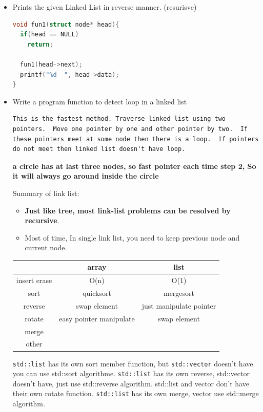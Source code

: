 \documentclass[a4paper,11pt,twoside]{book}
\begin{document}
\begin{itemize}
\begin{lstlisting}[frame=single, language=c++]
\end{lstlisting}


	\item Prints the given Linked List in reverse manner. (resurisve)
\begin{lstlisting}[frame=single, language=c++]
void fun1(struct node* head){
  if(head == NULL)
    return;
  
  fun1(head->next);
  printf("%d  ", head->data);
}
\end{lstlisting}

	\item Write a program function to detect loop in a linked list
\begin{lstlisting}[breaklines]
This is the fastest method. Traverse linked list using two pointers.  Move one pointer by one and other pointer by two.  If these pointers meet at some node then there is a loop.  If pointers do not meet then linked list doesn't have loop.
\end{lstlisting}
\textbf{a circle has at last three nodes, so fast pointer each time step 2, So it will always go around inside the circle}

	\par Summary of link list:
\begin{itemize}
\item \textbf{Just like tree, most link-list problems can be resolved by recursive}.

\item Most of time, In single link list, you need to keep previous node and current node. 
\end{itemize}

\begin{tabular}{|c|c|c|}
\hline 
 & array & list \\ 
\hline 
insert erase & O(n) & O(1) \\ 
\hline 
sort & quicksort & mergesort  \\ 
\hline 
reverse & swap element & just manipulate pointer  \\ 
\hline 
rotate & easy pointer manipulate & swap element  \\ 
\hline 
merge &  &  \\ 
\hline 
other  &  &  \\ 
\hline 
\end{tabular} 


\par \texttt{std::list} has its own sort member function, but \texttt{std::vector} doesn't have. you can use std::sort algorithme. \texttt{std::list} has its own reverse,  std::vector doesn't have, just use std::reverse algorithm. std::list and vector don't have their own rotate function. \texttt{std::list} has its own merge, vector use std::merge algorithm.

\end{itemize}
\end{document}
